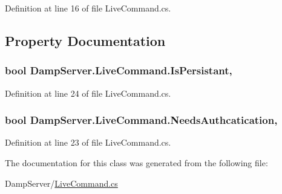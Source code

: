 Definition at line 16 of file Live\-Command.\-cs.



\subsection{Property Documentation}
\hypertarget{class_damp_server_1_1_live_command_a872c7ec27f8eeaf3dc38282370ff520e}{
\subsubsection[{Is\-Persistant}]{\setlength{\rightskip}{0pt plus 5cm}bool Damp\-Server.\-Live\-Command.\-Is\-Persistant\hspace{0.3cm}{\ttfamily [get]}, {\ttfamily [set]}}}\label{class_damp_server_1_1_live_command_a872c7ec27f8eeaf3dc38282370ff520e}


Definition at line 24 of file Live\-Command.\-cs.

\hypertarget{class_damp_server_1_1_live_command_a155d5c4cd08602357cc8202adc13d6ad}{
\subsubsection[{Needs\-Authcatication}]{\setlength{\rightskip}{0pt plus 5cm}bool Damp\-Server.\-Live\-Command.\-Needs\-Authcatication\hspace{0.3cm}{\ttfamily [get]}, {\ttfamily [set]}}}\label{class_damp_server_1_1_live_command_a155d5c4cd08602357cc8202adc13d6ad}


Definition at line 23 of file Live\-Command.\-cs.



The documentation for this class was generated from the following file\-:\begin{DoxyCompactItemize}
\item 
Damp\-Server/\hyperlink{_live_command_8cs}{Live\-Command.\-cs}\end{DoxyCompactItemize}
